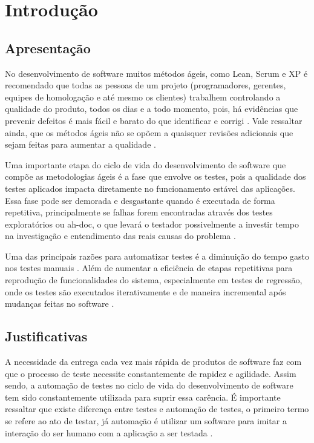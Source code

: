 \chapter{Introdução}

\section{Apresentação}

No desenvolvimento de software muitos métodos ágeis, como Lean, Scrum e XP é recomendado que todas as pessoas de um projeto (programadores, gerentes, equipes de homologação e até mesmo os clientes) trabalhem controlando a qualidade do produto, todos os dias e a todo momento, pois, há evidências que prevenir defeitos é mais fácil e barato do que identificar e corrigi \cite{inportanciaTestesAutomatizados}. Vale ressaltar ainda, que os métodos ágeis não se opõem a quaisquer revisões adicionais que sejam feitas para aumentar a qualidade \cite{inportanciaTestesAutomatizados}.

Uma importante etapa do ciclo de vida do desenvolvimento de software que compõe as metodologias ágeis é a fase que envolve os testes, pois a qualidade dos testes aplicados impacta diretamente no funcionamento estável das aplicações. Essa fase pode ser demorada e desgastante quando é executada de forma repetitiva, principalmente se falhas forem encontradas através dos testes exploratórios ou ah-doc, o que levará o testador possivelmente a investir tempo na investigação e entendimento das reais causas do problema \cite{XiangFeng2011}.

Uma das principais razões para automatizar testes é a diminuição do tempo gasto nos testes manuais \cite{Maldonado1988}. Além de aumentar a eficiência de etapas repetitivas para reprodução de funcionalidades do sistema, especialmente em testes de regressão, onde os testes são executados iterativamente e de maneira incremental após mudanças feitas no software \cite{Collins2012}.

\section{Justificativas}

A necessidade da entrega cada vez mais rápida de produtos de software faz com que o processo de teste necessite constantemente de rapidez e agilidade. Assim sendo, a automação de testes no ciclo de vida do desenvolvimento de software tem sido constantemente utilizada para suprir essa carência. É importante ressaltar que existe diferença entre testes e automação de testes, o primeiro termo se refere ao ato de testar, já automação é utilizar um software para imitar a interação do ser humano com a aplicação a ser testada \cite{Wanessa2012}.

